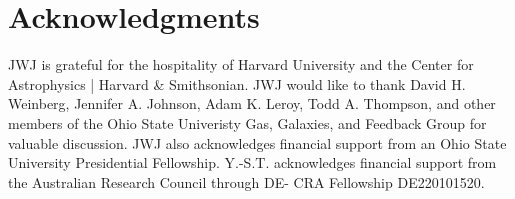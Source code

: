 \documentclass[ms.tex]{subfiles}
\begin{document}
\section{Acknowledgments}
\label{sec:acknowledgments}

JWJ is grateful for the hospitality of Harvard University and the 
Center for Astrophysics | Harvard \& Smithsonian.
JWJ would like to thank David H. Weinberg, Jennifer A. Johnson, Adam K. Leroy,
Todd A. Thompson, and other members of the Ohio State Univeristy Gas, Galaxies,
and Feedback Group for valuable discussion.
JWJ also acknowledges financial support from an Ohio State University
Presidential Fellowship.
Y.-S.T. acknowledges financial support from the Australian Research Council
through DE- CRA Fellowship DE220101520.
\end{document}
